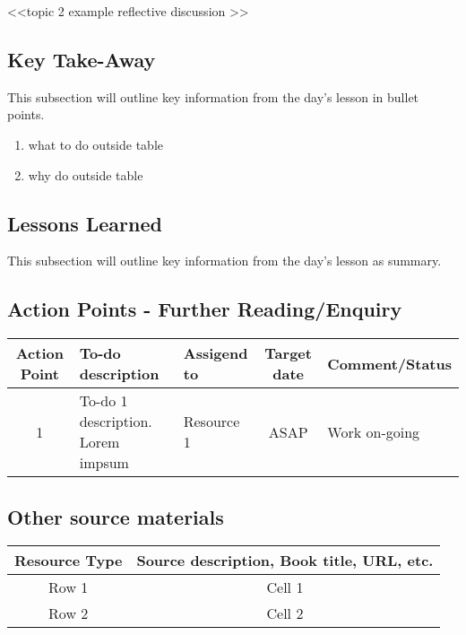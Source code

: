 <<topic 2 example reflective discussion >>





\subsection{Key Take-Away}

This subsection will outline key information from the day's lesson in bullet points.

\begin{enumerate}
    \item what to do outside table 
    \item why do outside table
\end{enumerate} 

\subsection{Lessons Learned}

This subsection will outline key information from the day's lesson as summary.


\subsection{Action Points - Further Reading/Enquiry}

\begin{tabular}{c|l|l|c|l}
    Action Point & To-do description & Assigend to & Target date & Comment/Status \\
    \hline
    1 & To-do 1 description. Lorem impsum & Resource 1 & ASAP & Work on-going \\
\end{tabular}


\subsection{Other source materials}

\begin{tabular}{c|c}
    Resource Type & Source description, Book title, URL, etc.\\
    \hline
    Row 1 & Cell 1\\ \hline
    Row 2 & Cell 2\\ \hline
\end{tabular}


